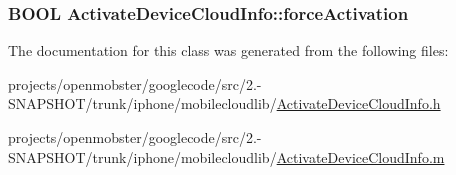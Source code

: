 \label{interface_activate_device_cloud_info_a356873d34a829b2cffcf5478c318c4aa}
\hypertarget{interface_activate_device_cloud_info_a1684a039a9a51efe1cb915f9557b1f73}{
\subsubsection[{force\-Activation}]{\setlength{\rightskip}{0pt plus 5cm}\-B\-O\-O\-L \-Activate\-Device\-Cloud\-Info\-::force\-Activation}}
\label{interface_activate_device_cloud_info_a1684a039a9a51efe1cb915f9557b1f73}


\-The documentation for this class was generated from the following files\-:\begin{DoxyCompactItemize}
\item 
projects/openmobster/googlecode/src/2.-\/\-S\-N\-A\-P\-S\-H\-O\-T/trunk/iphone/mobilecloudlib/\hyperlink{_activate_device_cloud_info_8h}{\-Activate\-Device\-Cloud\-Info.\-h}\item 
projects/openmobster/googlecode/src/2.-\/\-S\-N\-A\-P\-S\-H\-O\-T/trunk/iphone/mobilecloudlib/\hyperlink{_activate_device_cloud_info_8m}{\-Activate\-Device\-Cloud\-Info.\-m}\end{DoxyCompactItemize}
